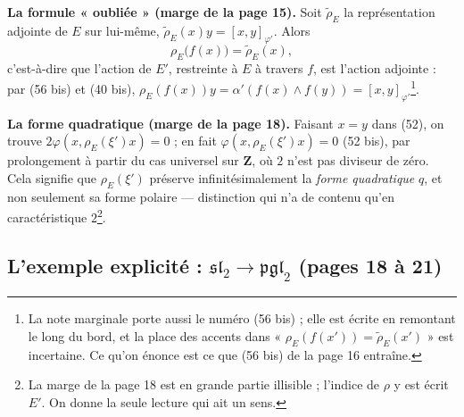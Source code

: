 \documentclass[11pt,a4paper]{article}
\begin{document}
\textbf{La formule « oubliée » (marge de la page 15).} Soit $\tilde{\rho}_E$ la
représentation adjointe de $E$ sur lui-même,
$\tilde{\rho}_E(x)y = [x, y]_{\varphi'}$. Alors
\[
  \rho_E\bigl(f(x)\bigr) = \tilde{\rho}_E(x) ,
\]
c'est-à-dire que l'action de $E'$, restreinte à $E$ à travers $f$, est l'action
adjointe : par (56 bis) et (40 bis),
$\rho_E(f(x))y = \alpha'(f(x) \wedge f(y)) = [x, y]_{\varphi'}$\footnote{La note
marginale porte aussi le numéro (56 bis) ; elle est écrite en remontant le long
du bord, et la place des accents dans « $\rho_E(f(x')) = \tilde{\rho}_E(x')$ » est
incertaine. Ce qu'on énonce est ce que (56 bis) de la page 16 entraîne.}.

\textbf{La forme quadratique (marge de la page 18).} Faisant $x = y$ dans (52), on
trouve $2\varphi(x, \rho_E(\xi')x) = 0$ ; en fait $\varphi(x, \rho_E(\xi')x) = 0$
(52 bis), par prolongement à partir du cas universel sur $\mathbf{Z}$, où $2$ n'est
pas diviseur de zéro. Cela signifie que $\rho_E(\xi')$ préserve infinitésimalement
la \emph{forme quadratique} $q$, et non seulement sa forme polaire — distinction
qui n'a de contenu qu'en caractéristique $2$\footnote{La marge de la page 18 est
en grande partie illisible ; l'indice de $\rho$ y est écrit $E'$. On donne la
seule lecture qui ait un sens.}.

\subsection*{L'exemple explicité : $\mathfrak{sl}_2 \to \mathfrak{pgl}_2$ (pages 18 à 21)}
\end{document}
